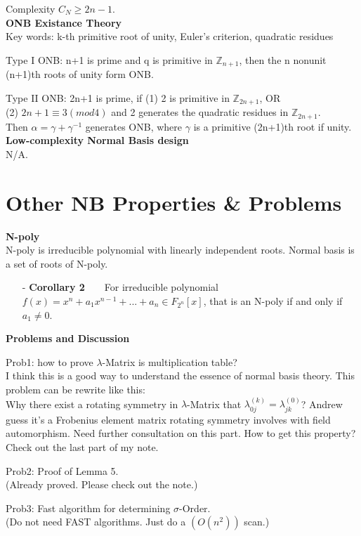 \documentclass[12pt]{article}
\begin{document}
Complexity $C_N \geq 2n - 1$.\\

\textbf{ONB Existance Theory}\\
Key words: k-th primitive root of unity, Euler's criterion, quadratic residues\\
\hspace{8mm}\par
Type I ONB: n+1 is prime and q is primitive in $\mathbb{Z}_{n+1}$, then the n nonunit (n+1)th roots of unity form ONB.\\
\hspace{8mm}\par
Type II ONB: 2n+1 is prime, if (1) 2 is primitive in $\mathbb{Z}_{2n+1}$, OR \\
(2) $2n + 1 \equiv 3(mod 4)$ and 2 generates the quadratic residues in $\mathbb{Z}_{2n+1}$.\\
Then $\alpha = \gamma + \gamma^{-1}$ generates ONB, where $\gamma$ is a primitive (2n+1)th root if unity.\\

\textbf{Low-complexity Normal Basis design}\\
N/A.\\

\section{Other NB Properties \& Problems}
\textbf{N-poly}\\
N-poly is irreducible polynomial with linearly independent roots. Normal basis is a set of roots of N-poly.
\begin{itemize}
\item[-] \textbf{Corollary 2}\ \ \ \ For irreducible polynomial $f(x) = x^n + a_1x^{n-1} + ... + a_n \in F_{2^n}[x]$, 
		that is an N-poly if and only if $a_1 \neq 0$.
\end{itemize}

\textbf{Problems and Discussion}\\
\hspace{8mm}\par
Prob1: how to prove $\lambda$-Matrix is multiplication table?\\
\indent I think this is a good way to understand the essence of normal basis 
theory. This problem can be rewrite like this:\\
Why there exist a rotating symmetry in $\lambda$-Matrix that
 $\lambda_{0j}^{(k)} = \lambda_{jk}^{(0)}$? Andrew guess it's a Frobenius
 element matrix rotating symmetry involves with field automorphism. Need 
further consultation on this part. How to get this property? Check out the
 last part of my note.\\
\hspace{8mm}\par
Prob2: Proof of Lemma 5.\\
(Already proved. Please check out the note.)\\
\hspace{8mm}\par
Prob3: Fast algorithm for determining $\sigma$-Order.\\
(Do not need FAST algorithms. Just do a $(O(n^2))$ scan.)\\
\end{document}

